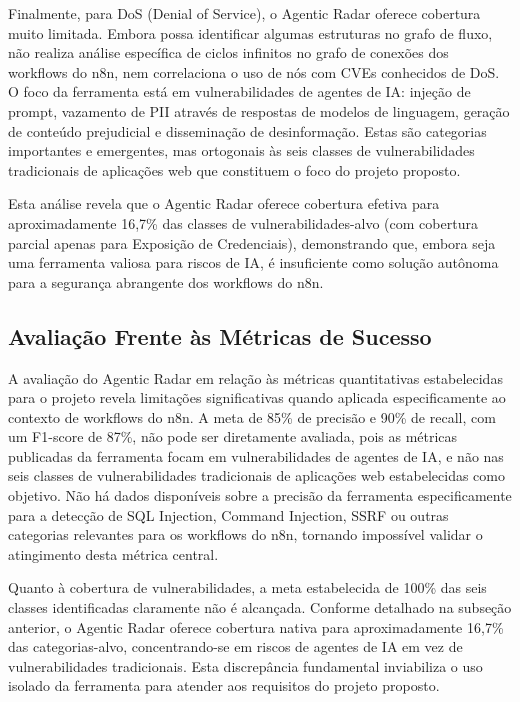 \documentclass{sftex}
\begin{document}
Finalmente, para DoS (Denial of Service), o Agentic Radar oferece cobertura muito limitada. Embora possa identificar algumas estruturas no grafo de fluxo, não realiza análise específica de ciclos infinitos no grafo de conexões dos workflows do n8n, nem correlaciona o uso de nós com CVEs conhecidos de DoS. O foco da ferramenta está em vulnerabilidades de agentes de IA: injeção de prompt, vazamento de PII através de respostas de modelos de linguagem, geração de conteúdo prejudicial e disseminação de desinformação. Estas são categorias importantes e emergentes, mas ortogonais às seis classes de vulnerabilidades tradicionais de aplicações web que constituem o foco do projeto proposto.

Esta análise revela que o Agentic Radar oferece cobertura efetiva para aproximadamente 16,7\% das classes de vulnerabilidades-alvo (com cobertura parcial apenas para Exposição de Credenciais), demonstrando que, embora seja uma ferramenta valiosa para riscos de IA, é insuficiente como solução autônoma para a segurança abrangente dos workflows do n8n.

\subsection{Avaliação Frente às Métricas de Sucesso}

A avaliação do Agentic Radar em relação às métricas quantitativas estabelecidas para o projeto revela limitações significativas quando aplicada especificamente ao contexto de workflows do n8n. A meta de 85\% de precisão e 90\% de recall, com um F1-score de 87\%, não pode ser diretamente avaliada, pois as métricas publicadas da ferramenta focam em vulnerabilidades de agentes de IA, e não nas seis classes de vulnerabilidades tradicionais de aplicações web estabelecidas como objetivo. Não há dados disponíveis sobre a precisão da ferramenta especificamente para a detecção de SQL Injection, Command Injection, SSRF ou outras categorias relevantes para os workflows do n8n, tornando impossível validar o atingimento desta métrica central.

Quanto à cobertura de vulnerabilidades, a meta estabelecida de 100\% das seis classes identificadas claramente não é alcançada. Conforme detalhado na subseção anterior, o Agentic Radar oferece cobertura nativa para aproximadamente 16,7\% das categorias-alvo, concentrando-se em riscos de agentes de IA em vez de vulnerabilidades tradicionais. Esta discrepância fundamental inviabiliza o uso isolado da ferramenta para atender aos requisitos do projeto proposto.
\end{document}

